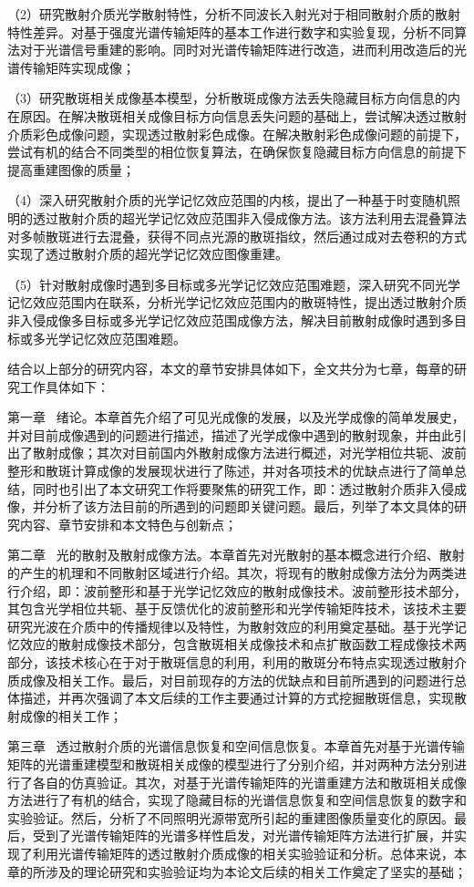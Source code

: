 （2）研究散射介质光学散射特性，分析不同波长入射光对于相同散射介质的散射特性差异。对基于强度光谱传输矩阵的基本工作进行数字和实验复现，分析不同算法对于光谱信号重建的影响。同时对光谱传输矩阵进行改造，进而利用改造后的光谱传输矩阵实现成像；

（3）研究散斑相关成像基本模型，分析散斑成像方法丢失隐藏目标方向信息的内在原因。在解决散斑相关成像目标方向信息丢失问题的基础上，尝试解决透过散射介质彩色成像问题，实现透过散射彩色成像。在解决散射彩色成像问题的前提下，尝试有机的结合不同类型的相位恢复算法，在确保恢复隐藏目标方向信息的前提下提高重建图像的质量；

（4）深入研究散射介质的光学记忆效应范围的内核，提出了一种基于时变随机照明的透过散射介质的超光学记忆效应范围非入侵成像方法。该方法利用去混叠算法对多帧散斑进行去混叠，获得不同点光源的散斑指纹，然后通过成对去卷积的方式实现了透过散射介质的超光学记忆效应图像重建。

（5）针对散射成像时遇到多目标或多光学记忆效应范围难题，深入研究不同光学记忆效应范围内在联系，分析光学记忆效应范围内的散斑特性，提出透过散射介质非入侵成像多目标或多光学记忆效应范围成像方法，解决目前散射成像时遇到多目标或多光学记忆效应范围难题。

结合以上部分的研究内容，本文的章节安排具体如下，全文共分为七章，每章的研究工作具体如下：

第一章 \ 绪论。本章首先介绍了可见光成像的发展，以及光学成像的简单发展史，并对目前成像遇到的问题进行描述，描述了光学成像中遇到的散射现象，并由此引出了散射成像；其次对目前国内外散射成像方法进行概述，对光学相位共轭、波前整形和散斑计算成像的发展现状进行了陈述，并对各项技术的优缺点进行了简单总结，同时也引出了本文研究工作将要聚焦的研究工作，即：透过散射介质非入侵成像，并分析了该方法目前的所遇到的问题即关键问题。最后，列举了本文具体的研究内容、章节安排和本文特色与创新点；

第二章 \ 光的散射及散射成像方法。本章首先对光散射的基本概念进行介绍、散射的产生的机理和不同散射区域进行介绍。其次，将现有的散射成像方法分为两类进行介绍，即：波前整形和基于光学记忆效应的散射成像技术。波前整形技术部分，其包含光学相位共轭、基于反馈优化的波前整形和光学传输矩阵技术，该技术主要研究光波在介质中的传播规律以及特性，为散射效应的利用奠定基础。基于光学记忆效应的散射成像技术部分，包含散斑相关成像技术和点扩散函数工程成像技术两部分，该技术核心在于对于散斑信息的利用，利用的散斑分布特点实现透过散射介质成像及相关工作。最后，对目前现存的方法的优缺点和目前所遇到的问题进行总体描述，并再次强调了本文后续的工作主要通过计算的方式挖掘散斑信息，实现散射成像的相关工作；

第三章 \ 透过散射介质的光谱信息恢复和空间信息恢复。本章首先对基于光谱传输矩阵的光谱重建模型和散斑相关成像的模型进行了分别介绍，并对两种方法分别进行了各自的仿真验证。其次，对基于光谱传输矩阵的光谱重建方法和散斑相关成像方法进行了有机的结合，实现了隐藏目标的光谱信息恢复和空间信息恢复的数字和实验验证。然后，分析了不同照明光源带宽所引起的重建图像质量变化的原因。最后，受到了光谱传输矩阵的光谱多样性启发，对光谱传输矩阵方法进行扩展，并实现了利用光谱传输矩阵的透过散射介质成像的相关实验验证和分析。总体来说，本章的所涉及的理论研究和实验验证均为本论文后续的相关工作奠定了坚实的基础；

